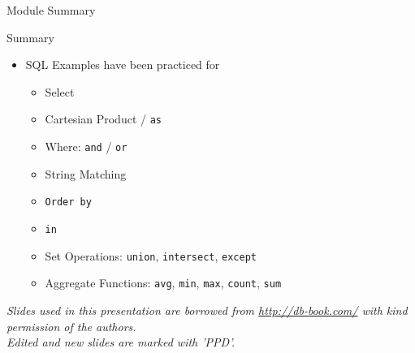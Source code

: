 \documentclass[aspectratio=169, xcolor=dvipsnames]{beamer}
\begin{document}
\begin{frame}{Module Summary}
    \begin{block}{Summary}
        \begin{itemize}[<+->]
            \item SQL Examples have been practiced for
            \begin{itemize}
                \item[$\triangleright$] Select
                \item[$\triangleright$] Cartesian Product / \texttt{as}
                \item[$\triangleright$] Where: \texttt{and} / \texttt{or}
                \item[$\triangleright$] String Matching
                \item[$\triangleright$] \texttt{Order by}
                \item[$\triangleright$] \texttt{in}
                \item[$\triangleright$] Set Operations: \texttt{union}, \texttt{intersect}, \texttt{except}
                \item[$\triangleright$] Aggregate Functions: \texttt{avg}, \texttt{min}, \texttt{max}, \texttt{count}, \texttt{sum}
            \end{itemize}
        \end{itemize}
    \end{block}
    \vspace{2em}
    \begin{center}
    \small \textit{Slides used in this presentation are borrowed from \url{http://db-book.com/} with kind permission of the authors.} \\
    \small \textit{Edited and new slides are marked with 'PPD'.}
    \end{center}
\end{frame}
\end{document}

